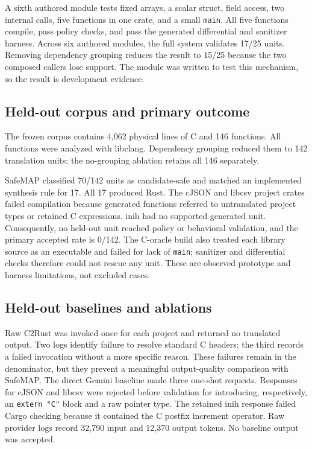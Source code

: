 \documentclass[conference]{IEEEtran}
\newcommand{\tool}{SafeMAP\xspace}
\begin{document}
A sixth authored module tests fixed arrays, a scalar struct, field access, two
internal calls, five functions in one crate, and a small \texttt{main}. All
five functions compile, pass policy checks, and pass the generated differential
and sanitizer harness. Across six authored modules, the full system validates
17/25 units. Removing dependency grouping reduces the result to 15/25 because
the two composed callers lose support. The module was written to test this
mechanism, so the result is development evidence.



\subsection{Held-out corpus and primary outcome}

The frozen corpus contains 4,062 physical lines of C and 146 functions. All
functions were analyzed with libclang. Dependency grouping reduced them to 142
translation units; the no-grouping ablation retains all 146 separately.



\tool classified 70/142 units as candidate-safe and matched an implemented
synthesis rule for 17. All 17 produced Rust. The cJSON and libcsv project
crates failed compilation because generated functions referred to untranslated
project types or retained C expressions. inih had no supported generated unit.
Consequently, no held-out unit reached policy or behavioral validation, and the
primary accepted rate is 0/142. The C-oracle build also treated each library
source as an executable and failed for lack of \texttt{main}; sanitizer and
differential checks therefore could not rescue any unit. These are observed
prototype and harness limitations, not excluded cases.



\subsection{Held-out baselines and ablations}

Raw C2Rust was invoked once for each project and returned no translated output.
Two logs identify failure to resolve standard C headers; the third records a
failed invocation without a more specific reason. These failures remain in the
denominator, but they prevent a meaningful output-quality comparison with
\tool. The direct Gemini baseline made three one-shot requests. Responses for
cJSON and libcsv were rejected before validation for introducing,
respectively, an \texttt{extern "C"} block and a raw pointer type. The retained
inih response failed Cargo checking because it contained the C postfix
increment operator. Raw provider logs record 32,790 input and 12,370 output
tokens. No baseline output was accepted.
\end{document}
